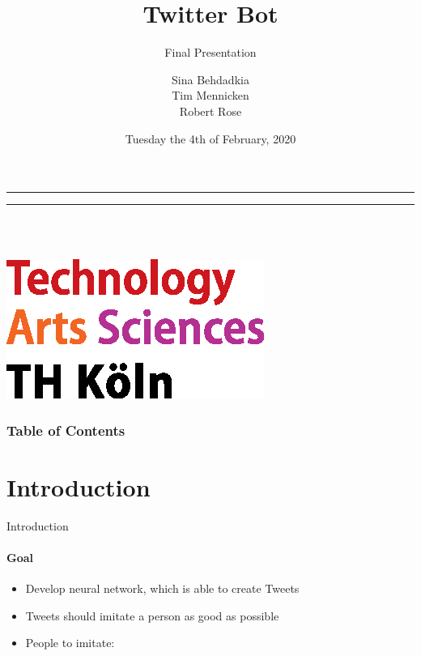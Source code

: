 \documentclass{beamer}
\title{Twitter Bot}
\subtitle{Final Presentation}
\author[Sina Behdadkia, Tim Mennicken, Robert Rose]{Sina Behdadkia\\ Tim Mennicken\\ Robert Rose }
\institute[TH Köln]{University of Applied Sciences Cologne}
\date[04.02.2020] %
{Tuesday the 4th of February, 2020}
\begin{document}
\bgroup
\makeatletter
{}
{
	\leavevmode
    \begin{beamercolorbox}[wd=0.125\paperwidth,dp=1pt]{}
    \end{beamercolorbox}%
    \begin{beamercolorbox}[wd=0.875\paperwidth,dp=0ex]{}
    \hrule
    \vspace{0.1mm}
    \hrule
    \vspace{1mm}
    \parbox[b]{0.3\paperwidth}{\inserttitle\\[1.5mm] \insertshortauthor\\ \insertshortdate}
    \hfill
    \includegraphics[width=0.12\paperwidth]{sources/logo_TH-Koeln_CMYK_22pt}
    \hspace{2mm}
    \vspace{1mm}
    \end{beamercolorbox}%
}
\makeatother
\begin{frame}
\titlepage
\end{frame}
\egroup

\setcounter{framenumber}{0}

\begin{frame}
\frametitle{Table of Contents}
\tableofcontents
\end{frame} 
 
\section{Introduction}

\begin{frame}{Introduction}
\framesubtitle{Goal}
\begin{itemize}
\item Develop neural network, which is able to create Tweets
\item Tweets should imitate a person as good as possible
\item People to imitate:
\end{itemize}
\pause
\vfill
{}
\end{frame}
\end{document}
